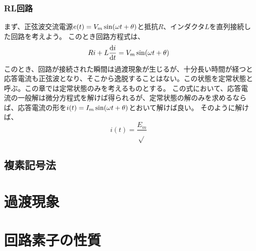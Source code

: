 \documentclass{ltjsreport}
\newcommand{\dft}[1]{\frac{\mathrm{d}#1}{\mathrm{d}t}}
\begin{document}
\subsubsection{RL回路}
まず、正弦波交流電源$e(t) = V_m \sin(\omega t + \theta)$と抵抗$R$、インダクタ$L$を直列接続した回路を考えよう。
このとき回路方程式は、
\[
  Ri +L \dft{i} = \vsin
\]
このとき、回路が接続された瞬間は過渡現象が生じるが、十分長い時間が経つと応答電流も正弦波となり、そこから逸脱することはない。この状態を定常状態と呼ぶ。この章では定常状態のみを考えるものとする。
この式において、応答電流の一般解は微分方程式を解けば得られるが、定常状態の解のみを求めるならば、応答電流の形を$i(t) = I_m \sin(\omega t + \theta)$とおいて解けば良い。
そのように解けば、
\[
  i(t) = \frac{E_m}{\sqrt{}}
\]

\subsection{複素記号法}


\section{過渡現象}

\section{回路素子の性質}








\end{document}
